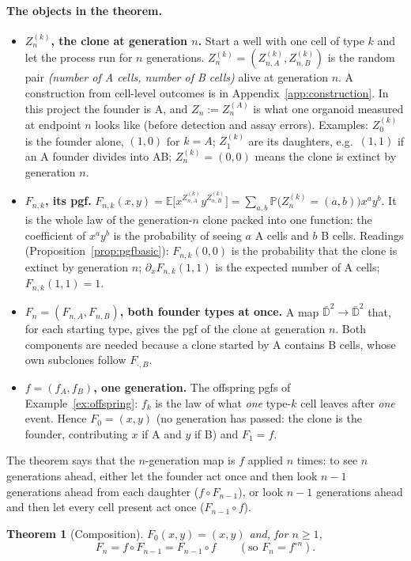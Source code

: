 \documentclass[11pt]{article}
\newtheorem{theorem}{Theorem}[section]
\theoremstyle{definition}
\theoremstyle{remark}
\newcommand{\E}{\mathbb{E}}
\newcommand{\Prob}{\mathbb{P}}
\begin{document}
\paragraph{The objects in the theorem.}
\begin{itemize}
\item \textbf{$Z_n^{(k)}$, the clone at generation $n$.} Start a well with one cell of type $k$ and let the process run for $n$ generations. $Z_n^{(k)}=(Z^{(k)}_{n,A},Z^{(k)}_{n,B})$ is the random pair \emph{(number of A cells, number of B cells)} alive at generation $n$. A construction from cell-level outcomes is in Appendix~\ref{app:construction}. In this project the founder is A, and $Z_n:=Z_n^{(A)}$ is what one organoid measured at endpoint $n$ looks like (before detection and assay errors). Examples: $Z_0^{(k)}$ is the founder alone, $(1,0)$ for $k=A$; $Z_1^{(k)}$ are its daughters, e.g.\ $(1,1)$ if an A founder divides into AB; $Z_n^{(k)}=(0,0)$ means the clone is extinct by generation $n$.
\item \textbf{$F_{n,k}$, its pgf.} $F_{n,k}(x,y)=\E\big[x^{Z^{(k)}_{n,A}}y^{Z^{(k)}_{n,B}}\big]=\sum_{a,b}\Prob\big(Z_n^{(k)}=(a,b)\big)x^ay^b$. It is the whole law of the generation-$n$ clone packed into one function: the coefficient of $x^ay^b$ is the probability of seeing $a$ A cells and $b$ B cells. Readings (Proposition~\ref{prop:pgfbasic}): $F_{n,k}(0,0)$ is the probability that the clone is extinct by generation $n$; $\partial_xF_{n,k}(1,1)$ is the expected number of A cells; $F_{n,k}(1,1)=1$.
\item \textbf{$F_n=(F_{n,A},F_{n,B})$, both founder types at once.} A map $\bar{\mathbb D}^2\to\bar{\mathbb D}^2$ that, for each starting type, gives the pgf of the clone at generation $n$. Both components are needed because a clone started by A contains B cells, whose own subclones follow $F_{\cdot,B}$.
\item \textbf{$f=(f_A,f_B)$, one generation.} The offspring pgfs of Example~\ref{ex:offspring}: $f_k$ is the law of what \emph{one} type-$k$ cell leaves after \emph{one} event. Hence $F_0=(x,y)$ (no generation has passed: the clone is the founder, contributing $x$ if A and $y$ if B) and $F_1=f$.
\end{itemize}
\noindent The theorem says that the $n$-generation map is $f$ applied $n$ times: to see $n$ generations ahead, either let the founder act once and then look $n-1$ generations ahead from each daughter ($f\circ F_{n-1}$), or look $n-1$ generations ahead and then let every cell present act once ($F_{n-1}\circ f$).
\begin{theorem}[Composition]\label{thm:gwcomp}
$F_0(x,y)=(x,y)$ and, for $n\ge1$,
\[
F_n=f\circ F_{n-1}=F_{n-1}\circ f\qquad(\text{so }F_n=f^{\circ n}).
\]
\end{theorem}
\end{document}
